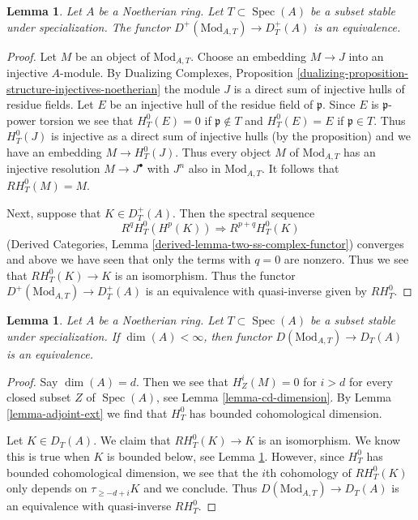 \documentclass{stacks-project}
\theoremstyle{plain}
\newtheorem{lemma}[subsection]{Lemma}
\theoremstyle{definition}
\theoremstyle{remark}
\numberwithin{equation}{subsection}
\def\Spec{\mathop{\mathrm{Spec}}}
\begin{document}
\begin{lemma}
\label{lemma-equal-plus}
Let $A$ be a Noetherian ring. Let $T \subset \Spec(A)$ be a subset stable
under specialization. The functor $D^+(\text{Mod}_{A, T}) \to D^+_T(A)$
is an equivalence.
\end{lemma}

\begin{proof}
Let $M$ be an object of $\text{Mod}_{A, T}$. Choose an embedding
$M \to J$ into an injective $A$-module. By
Dualizing Complexes, Proposition
\ref{dualizing-proposition-structure-injectives-noetherian}
the module $J$ is a direct sum of injective hulls of residue fields.
Let $E$ be an injective hull of the residue field of $\mathfrak p$.
Since $E$ is $\mathfrak p$-power torsion we see that
$H^0_T(E) = 0$ if $\mathfrak p \not \in T$ and
$H^0_T(E) = E$ if $\mathfrak p \in T$.
Thus $H^0_T(J)$ is injective as a direct sum of injective hulls
(by the proposition) and we have an embedding $M \to H^0_T(J)$.
Thus every object $M$ of $\text{Mod}_{A, T}$ has an injective resolution
$M \to J^\bullet$ with $J^n$ also in $\text{Mod}_{A, T}$. It follows
that $RH^0_T(M) = M$.

\medskip\noindent
Next, suppose that $K \in D_T^+(A)$. Then the spectral sequence
$$
R^qH^0_T(H^p(K)) \Rightarrow R^{p + q}H^0_T(K)
$$
(Derived Categories, Lemma \ref{derived-lemma-two-ss-complex-functor})
converges and above we have seen that only the terms with $q = 0$
are nonzero. Thus we see that $RH^0_T(K) \to K$ is an isomorphism.
Thus the functor $D^+(\text{Mod}_{A, T}) \to D^+_T(A)$
is an equivalence with quasi-inverse given by $RH^0_T$.
\end{proof}

\begin{lemma}
\label{lemma-equal-full}
Let $A$ be a Noetherian ring. Let $T \subset \Spec(A)$ be a subset stable
under specialization. If $\dim(A) < \infty$, then functor
$D(\text{Mod}_{A, T}) \to D_T(A)$ is an equivalence.
\end{lemma}

\begin{proof}
Say $\dim(A) = d$. Then we see that $H^i_Z(M) = 0$ for $i > d$
for every closed subset $Z$ of $\Spec(A)$, see
Lemma \ref{lemma-cd-dimension}.
By Lemma \ref{lemma-adjoint-ext} we find that $H^0_T$ has bounded
cohomological dimension.

\medskip\noindent
Let $K \in D_T(A)$. We claim that $RH^0_T(K) \to K$ is an
isomorphism. We know this is true when $K$ is bounded below, see
Lemma \ref{lemma-equal-plus}. However, since $H^0_T$ has bounded
cohomological dimension, we see that the $i$th cohomology of
$RH_T^0(K)$ only depends on $\tau_{\geq -d + i}K$ and we conclude.
Thus $D(\text{Mod}_{A, T}) \to D_T(A)$ is an equivalence with
quasi-inverse $RH^0_T$.
\end{proof}
\end{document}
